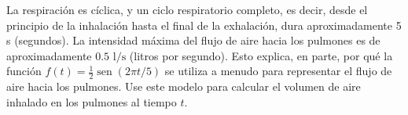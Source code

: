 \item La respiración es cíclica, y un ciclo respiratorio completo, es decir, desde el principio de la inhalación hasta el final de la exhalación, dura aproximadamente 5 s (segundos). La intensidad máxima del flujo de aire hacia los pulmones es de aproximadamente $0.5 \text{ l/s}$ (litros por segundo). Esto explica, en parte, por qué la función $f(t) = \frac{1}{2} \operatorname{sen}(2\pi t / 5)$ se utiliza a menudo para representar el flujo de aire hacia los pulmones. Use este modelo para calcular el volumen de aire inhalado en los pulmones al tiempo $t$.
